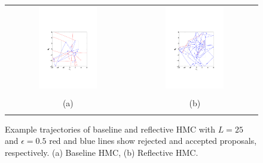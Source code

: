 \documentclass{article} %
\begin{document}
\begin{figure}
\setlength{\tabcolsep}{0em}
\vspace{-1mm}
\begin{center}
\begin{tabular}{cc}
\includegraphics[trim={3.2cm 6cm 3.2cm 9cm},clip,width=0.49\textwidth]{../plots3/BaselineHMC_l10_eps0_5_log_scatter2D.pdf} 
&\includegraphics[trim={3.2cm 6cm 3cm 9cm},clip,width=0.49\textwidth]{../plots3/ReflectiveHMC_l10_eps0_5_log_scatter2D.pdf}  \\
\vspace{-3.5mm}
\\
   \footnotesize(a) 
& \footnotesize(b) 
\\
\multicolumn{2}{c}{}
\end{tabular}
\end{center}
\vspace{-8mm}
\caption{\footnotesize
Example trajectories of baseline and reflective HMC with $L=25$ and $\epsilon=0.5$ red and blue lines show rejected and accepted proposals, respectively. (a) Baseline HMC, (b) Reflective HMC.}
\vspace{-10pt}
\label{fig:sup.traj1}
\end{figure}
\end{document}

